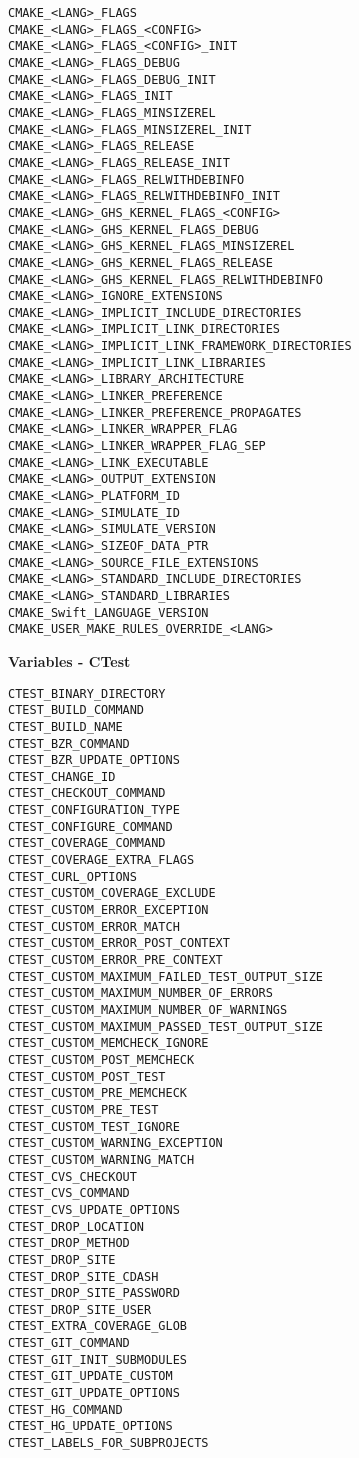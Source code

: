 \documentclass{article}
\begin{document}
\pagebreak

\begin{minipage}[t]{0.18\linewidth}
\begin{verbatim}
CMAKE_<LANG>_FLAGS
CMAKE_<LANG>_FLAGS_<CONFIG>
CMAKE_<LANG>_FLAGS_<CONFIG>_INIT
CMAKE_<LANG>_FLAGS_DEBUG
CMAKE_<LANG>_FLAGS_DEBUG_INIT
CMAKE_<LANG>_FLAGS_INIT
CMAKE_<LANG>_FLAGS_MINSIZEREL
CMAKE_<LANG>_FLAGS_MINSIZEREL_INIT
CMAKE_<LANG>_FLAGS_RELEASE
CMAKE_<LANG>_FLAGS_RELEASE_INIT
CMAKE_<LANG>_FLAGS_RELWITHDEBINFO
CMAKE_<LANG>_FLAGS_RELWITHDEBINFO_INIT
CMAKE_<LANG>_GHS_KERNEL_FLAGS_<CONFIG>
CMAKE_<LANG>_GHS_KERNEL_FLAGS_DEBUG
CMAKE_<LANG>_GHS_KERNEL_FLAGS_MINSIZEREL
CMAKE_<LANG>_GHS_KERNEL_FLAGS_RELEASE
CMAKE_<LANG>_GHS_KERNEL_FLAGS_RELWITHDEBINFO
CMAKE_<LANG>_IGNORE_EXTENSIONS
CMAKE_<LANG>_IMPLICIT_INCLUDE_DIRECTORIES
CMAKE_<LANG>_IMPLICIT_LINK_DIRECTORIES
CMAKE_<LANG>_IMPLICIT_LINK_FRAMEWORK_DIRECTORIES
CMAKE_<LANG>_IMPLICIT_LINK_LIBRARIES
CMAKE_<LANG>_LIBRARY_ARCHITECTURE
CMAKE_<LANG>_LINKER_PREFERENCE
CMAKE_<LANG>_LINKER_PREFERENCE_PROPAGATES
CMAKE_<LANG>_LINKER_WRAPPER_FLAG
CMAKE_<LANG>_LINKER_WRAPPER_FLAG_SEP
CMAKE_<LANG>_LINK_EXECUTABLE
CMAKE_<LANG>_OUTPUT_EXTENSION
CMAKE_<LANG>_PLATFORM_ID
CMAKE_<LANG>_SIMULATE_ID
CMAKE_<LANG>_SIMULATE_VERSION
CMAKE_<LANG>_SIZEOF_DATA_PTR
CMAKE_<LANG>_SOURCE_FILE_EXTENSIONS
CMAKE_<LANG>_STANDARD_INCLUDE_DIRECTORIES
CMAKE_<LANG>_STANDARD_LIBRARIES
CMAKE_Swift_LANGUAGE_VERSION
CMAKE_USER_MAKE_RULES_OVERRIDE_<LANG>
\end{verbatim}

\textbf{Variables - CTest}
\begin{verbatim}
CTEST_BINARY_DIRECTORY
CTEST_BUILD_COMMAND
CTEST_BUILD_NAME
CTEST_BZR_COMMAND
CTEST_BZR_UPDATE_OPTIONS
CTEST_CHANGE_ID
CTEST_CHECKOUT_COMMAND
CTEST_CONFIGURATION_TYPE
CTEST_CONFIGURE_COMMAND
CTEST_COVERAGE_COMMAND
CTEST_COVERAGE_EXTRA_FLAGS
CTEST_CURL_OPTIONS
CTEST_CUSTOM_COVERAGE_EXCLUDE
CTEST_CUSTOM_ERROR_EXCEPTION
CTEST_CUSTOM_ERROR_MATCH
CTEST_CUSTOM_ERROR_POST_CONTEXT
CTEST_CUSTOM_ERROR_PRE_CONTEXT
CTEST_CUSTOM_MAXIMUM_FAILED_TEST_OUTPUT_SIZE
CTEST_CUSTOM_MAXIMUM_NUMBER_OF_ERRORS
CTEST_CUSTOM_MAXIMUM_NUMBER_OF_WARNINGS
CTEST_CUSTOM_MAXIMUM_PASSED_TEST_OUTPUT_SIZE
CTEST_CUSTOM_MEMCHECK_IGNORE
CTEST_CUSTOM_POST_MEMCHECK
CTEST_CUSTOM_POST_TEST
CTEST_CUSTOM_PRE_MEMCHECK
CTEST_CUSTOM_PRE_TEST
CTEST_CUSTOM_TEST_IGNORE
CTEST_CUSTOM_WARNING_EXCEPTION
CTEST_CUSTOM_WARNING_MATCH
CTEST_CVS_CHECKOUT
CTEST_CVS_COMMAND
CTEST_CVS_UPDATE_OPTIONS
CTEST_DROP_LOCATION
CTEST_DROP_METHOD
CTEST_DROP_SITE
CTEST_DROP_SITE_CDASH
CTEST_DROP_SITE_PASSWORD
CTEST_DROP_SITE_USER
CTEST_EXTRA_COVERAGE_GLOB
CTEST_GIT_COMMAND
CTEST_GIT_INIT_SUBMODULES
CTEST_GIT_UPDATE_CUSTOM
CTEST_GIT_UPDATE_OPTIONS
CTEST_HG_COMMAND
CTEST_HG_UPDATE_OPTIONS
CTEST_LABELS_FOR_SUBPROJECTS
\end{verbatim}
\end{minipage}
\end{document}
